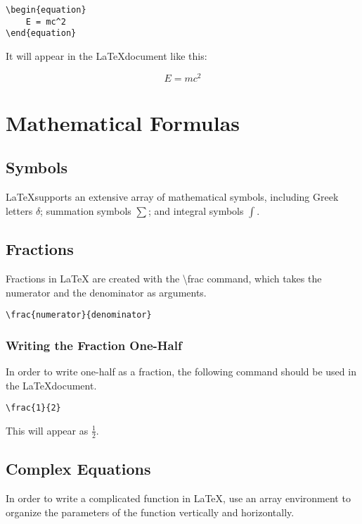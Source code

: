 \documentclass[12pt,journal,compsoc]{IEEEtran}
\begin{document}
\begin{verbatim}
\begin{equation}
    E = mc^2
\end{equation}
\end{verbatim}

It will appear in the \LaTeX document like this:

\begin{equation}
    E = mc^2
\end{equation}

\section{Mathematical Formulas}

\subsection{Symbols}
\LaTeX supports an extensive array of mathematical symbols, including Greek letters \( \delta \); summation symbols \( \sum \); and integral symbols \( \int \).

\subsection{Fractions}
Fractions in LaTeX are created with the \textbackslash frac{} command, which takes the numerator and the denominator as arguments. 

\begin{verbatim}
\frac{numerator}{denominator}
\end{verbatim}

\subsubsection{Writing the Fraction One-Half}
In order to write one-half as a fraction, the following command should be used in the \LaTeX document. 
\begin{verbatim}
\frac{1}{2}
\end{verbatim}

This will appear as \( \frac{1}{2} \). 

\subsection{Complex Equations}
In order to write a complicated function in \LaTeX, use an array environment to organize the parameters of the function vertically and horizontally. 
\end{document}
